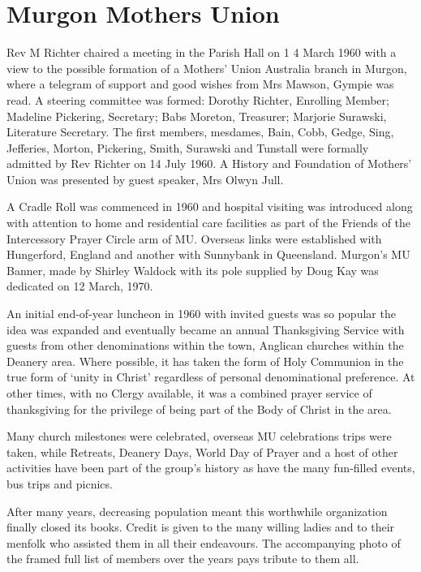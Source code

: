 \section{Murgon Mothers Union}



Rev M Richter chaired a meeting in the Parish Hall on 1 4 March 1960 with a view to the possible formation of a Mothers' Union Australia branch in Murgon, where a telegram of support and good wishes from Mrs Mawson, Gympie was read. A steering committee was formed: Dorothy Richter, Enrolling Member; Madeline Pickering, Secretary; Babs Moreton, Treasurer; Marjorie Surawski, Literature Secretary. The first members, mesdames, Bain, Cobb, Gedge, Sing, Jefferies, Morton, Pickering, Smith, Surawski and Tunstall were formally admitted by Rev Richter on 14 July 1960. A History and Foundation of Mothers' Union was presented by guest speaker, Mrs Olwyn Jull.



A Cradle Roll was commenced in 1960 and hospital visiting was introduced along with attention to home and residential care facilities as part of the Friends of the Intercessory Prayer Circle arm of MU. Overseas links were established with Hungerford, England and another with Sunnybank in Queensland. Murgon's MU Banner, made by Shirley Waldock with its pole supplied by Doug Kay was dedicated on 12 March, 1970.



An initial end-of-year luncheon in 1960 with invited guests was so popular the idea was expanded and eventually became an annual Thanksgiving Service with guests from other denominations within the town, Anglican churches within the Deanery area. Where possible, it has taken the form of Holy Communion in the true form of `unity in Christ' regardless of personal denominational preference. At other times, with no Clergy available, it was a combined prayer service of thanksgiving for the privilege of being part of the Body of Christ in the area.



Many church milestones were celebrated, overseas MU celebrations trips were taken, while Retreats, Deanery Days, World Day of Prayer and a host of other activities have been part of the group's history as have the many fun-filled events, bus trips and picnics.



After many years, decreasing population meant this worthwhile organization finally closed its books. Credit is given to the many willing ladies and to their menfolk who assisted them in all their endeavours. The accompanying photo of the framed full list of members over the years pays tribute to them all.

